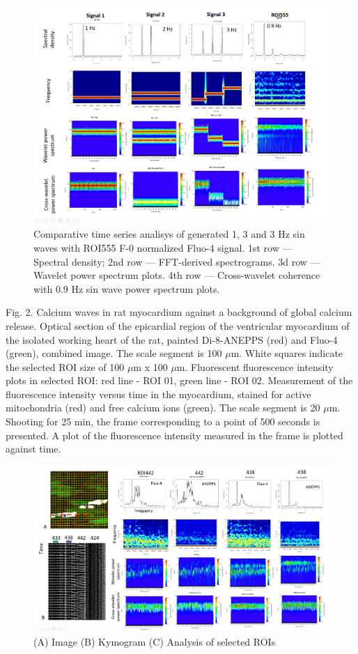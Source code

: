 \documentclass{biophys-new}
\begin{document}
\begin{figure}
    \includegraphics[width=0.9\linewidth]{fig7.png}
    \caption{Comparative time series analisys of generated 1, 3 and 3 Hz sin waves with ROI555 F-0 normalized Fluo-4 signal. 1st row --- Spectral density; 2nd row --- FFT-derived spectrograms. 3d row --- Wavelet power spectrum plots. 4th row --- Cross-wavelet coherence with 0.9 Hz sin wave power spectrum plots. }
    \label{fig:fig7}
\end{figure}


Fig. 2.  Calcium waves in rat myocardium against a background of global calcium release.
Optical section of the epicardial region of the ventricular myocardium of the isolated working heart of the rat, painted Di-8-ANEPPS (red) and Fluo-4 (green), combined image.
The scale segment is 100 $\mu$m.
White squares indicate the selected ROI size of 100 $\mu$m x 100 $\mu$m.
Fluorescent fluorescence intensity plots in selected ROI: red line - ROI 01, green line - ROI 02.
Measurement of the fluorescence intensity versus time in the myocardium, stained for active mitochondria (red) and free calcium ions (green).
The scale segment is 20 $\mu$m. Shooting for 25 min, the frame corresponding to a point of 500 seconds is presented.
A plot of the fluorescence intensity measured in the frame is plotted against time.


\begin{figure}
    \includegraphics[width=0.9\linewidth]{fig8.png}
    \caption{(A) Image (B) Kymogram (C) Analysis of selected ROIs}
    \label{fig:fig8}
\end{figure}
\end{document}
